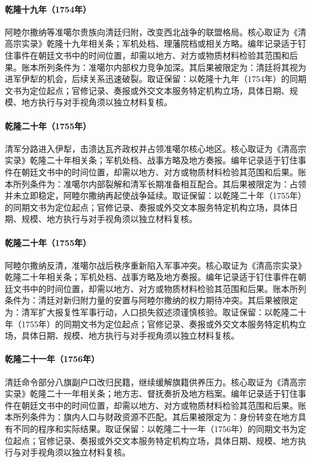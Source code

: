 \hypertarget{ledger:EQ-1754-AMURSANA-DEFECTION}{}\paragraph{乾隆十九年（1754年）}阿睦尔撒纳等准噶尔贵族向清廷归附，改变西北战争的联盟格局。核心取证为《清高宗实录》乾隆十九年相关条；军机处档、理藩院档或相关方略。编年记录适于钉住事件在朝廷文书中的时间位置，却需以地方、对方或物质材料检验其范围和后果。账本所列条件为：准噶尔内部权力竞争加深。其后果被限定为：清廷将其视为进军伊犁的机会，后续关系迅速破裂。取证保留：以乾隆十九年（1754年）的同期文书为定位起点；官修记录、奏报或外交文本服务特定机构立场，具体日期、规模、地方执行与对手视角须以独立材料复核。
\hypertarget{ledger:EQ-1755-ILI-EXPEDITION}{}\paragraph{乾隆二十年（1755年）}清军分路进入伊犁，击溃达瓦齐政权并占领准噶尔核心地区。核心取证为《清高宗实录》乾隆二十年相关条；军机处档、战事方略及地方奏报。编年记录适于钉住事件在朝廷文书中的时间位置，却需以地方、对方或物质材料检验其范围和后果。账本所列条件为：准噶尔内部裂解和清军长期准备相互配合。其后果被限定为：占领并未立即稳定，阿睦尔撒纳再起使战争延续。取证保留：以乾隆二十年（1755年）的同期文书为定位起点；官修记录、奏报或外交文本服务特定机构立场，具体日期、规模、地方执行与对手视角须以独立材料复核。
\hypertarget{ledger:EQ-1755-AMURSANA-REVOLT}{}\paragraph{乾隆二十年（1755年）}阿睦尔撒纳反清，准噶尔战后秩序重新陷入军事冲突。核心取证为《清高宗实录》乾隆二十年相关条；军机处档、战事方略及地方奏报。编年记录适于钉住事件在朝廷文书中的时间位置，却需以地方、对方或物质材料检验其范围和后果。账本所列条件为：清廷对新归附力量的安置与阿睦尔撒纳的权力期待冲突。其后果被限定为：清军扩大报复性军事行动，人口损失叙述须谨慎核验。取证保留：以乾隆二十年（1755年）的同期文书为定位起点；官修记录、奏报或外交文本服务特定机构立场，具体日期、规模、地方执行与对手视角须以独立材料复核。
\hypertarget{ledger:EQ-1756-BANNER-CIVILIAN-REGISTRATION}{}\paragraph{乾隆二十一年（1756年）}清廷命令部分八旗副户口改归民籍，继续缓解旗籍供养压力。核心取证为《清高宗实录》乾隆二十一年相关条；地方志、督抚奏折及地方档案。编年记录适于钉住事件在朝廷文书中的时间位置，却需以地方、对方或物质材料检验其范围和后果。账本所列条件为：旗内人口与财政资源不匹配。其后果被限定为：身份转变在地方具有不同的程序和实际结果。取证保留：以乾隆二十一年（1756年）的同期文书为定位起点；官修记录、奏报或外交文本服务特定机构立场，具体日期、规模、地方执行与对手视角须以独立材料复核。
